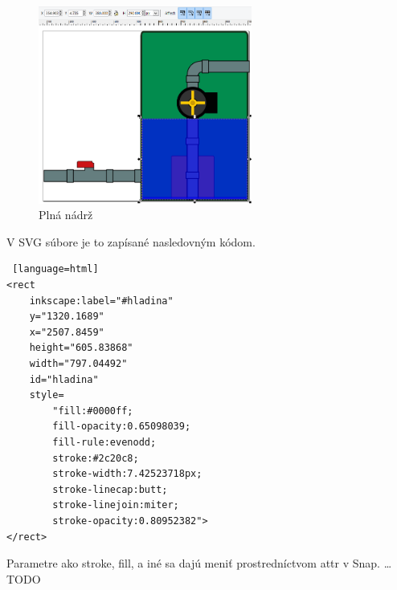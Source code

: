 \begin{figure}[hp]
	\begin{center}
		\includegraphics [height=6.5cm]  {obrazky/obr5.png}
		\caption{Plná nádrž}
		\label{picture5}
	\end{center}
\end{figure}

V SVG súbore je to zapísané nasledovným kódom. 

\begin{lstlisting} [language=html]
<rect
	inkscape:label="#hladina"
	y="1320.1689"
	x="2507.8459"
	height="605.83868"
	width="797.04492"
	id="hladina"
	style=
		"fill:#0000ff;
		fill-opacity:0.65098039;
		fill-rule:evenodd;
		stroke:#2c20c8;
		stroke-width:7.42523718px;
		stroke-linecap:butt;
		stroke-linejoin:miter;
		stroke-opacity:0.80952382">
</rect>
\end{lstlisting}


Parametre ako stroke, fill, a iné sa dajú meniť prostredníctvom attr v Snap. … TODO


